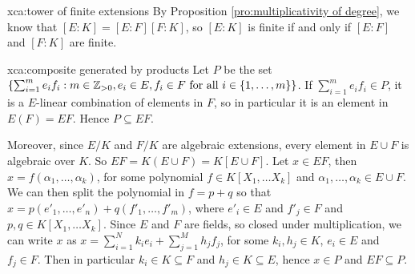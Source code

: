 \begin{sol}{xca:tower of finite extensions}
By Proposition \ref{pro:multiplicativity of degree},
we know that $[E:K]=[E:F][F:K]$, so 
$[E:K]$ is finite if and only if $[E:F]$ and $[F:K]$ are finite.
\end{sol}

\begin{sol}{xca:composite generated by products}
Let $P$ be the set 
$\left\{\sum_{i=1}^me_if_i:m\in\mathbb{Z}_{>0},e_i\in E,f_i\in F\text{ for all $i\in\{1,\dots,m\}$}\right\}$.
If $\sum_{i=1}^me_if_i\in P$, it is a $E$-linear combination
of elements in $F$, so in particular it is an element
in $E(F)=EF$. Hence $P\subseteq EF$.

Moreover, since $E/K$ and $F/K$ are algebraic extensions,
every element in $E\cup F$ is algebraic over $K$.
So $EF=K(E\cup F)=K[E\cup F]$.
Let $x\in EF$, then $x=f(\alpha_1,\dots,\alpha_k)$,
for some polynomial $f\in K[X_1,\dots X_k]$ 
and $\alpha_1,\dots,\alpha_k\in E\cup F$.
We can then split the polynomial in $f=p+q$ so that 
$x=p(e'_1,\dots,e'_n)+q(f'_1,\dots,f'_m)$,
where $e'_i\in E$ and $f'_j\in F$ and $p,q\in K[X_1,\dots X_k]$.
Since $E$ and $F$ are fields, so closed under multiplication,
we can write $x$ as $x=\sum_{i=1}^Nk_ie_i+\sum_{j=1}^Mh_jf_j$,
for some $k_i,h_j\in K$, $e_i\in E$ and $f_j\in F$.
Then in particular $k_i\in K\subseteq F$ and $h_j\in K\subseteq E$, hence $x\in P$ and $EF\subseteq P$.
\end{sol}

